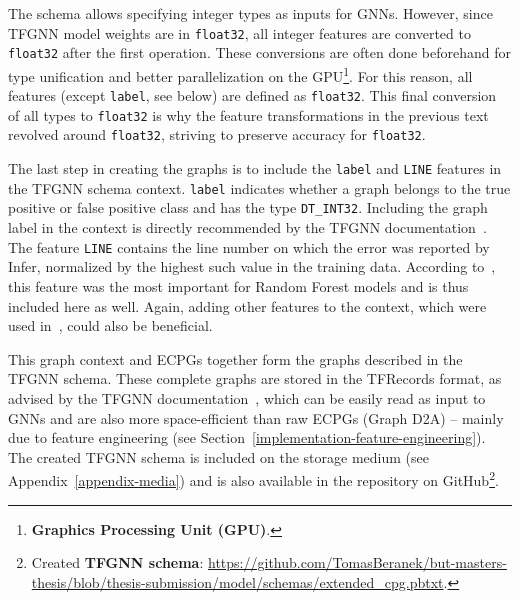 The schema allows specifying integer types as inputs for GNNs. However, since TFGNN model weights are in \texttt{float32}, all integer features are converted to \texttt{float32} after the first operation. These conversions are often done beforehand for type unification and better parallelization on the GPU\footnote{\textbf{Graphics Processing Unit (GPU)}.}. For this reason, all features (except \texttt{label}, see below) are defined as \texttt{float32}. This final conversion of all types to \texttt{float32} is why the feature transformations in the previous text revolved around \texttt{float32}, striving to preserve accuracy for \texttt{float32}.

The last step in creating the graphs is to include the \texttt{label} and \texttt{LINE} features in the TFGNN schema context. \texttt{label} indicates whether a graph belongs to the true positive or false positive class and has the type \texttt{DT\_INT32}. Including the graph label in the context is directly recommended by the TFGNN documentation~\cite{tfgnn-schema}. The feature \texttt{LINE} contains the line number on which the error was reported by Infer, normalized by the highest such value in the training data. According to~\cite{pujar2024analyzing}, this feature was the most important for Random Forest models and is thus included here as well. Again, adding other features to the context, which were used in~\cite{D2A-zheng2021d2a, pujar2024analyzing}, could also be beneficial.

This graph context and ECPGs together form the graphs described in the TFGNN schema. These complete graphs are stored in the TFRecords format, as advised by the TFGNN documentation~\cite{tfgnn-schema}, which can be easily read as input to GNNs and are also more space-efficient than raw ECPGs (Graph D2A) -- mainly due to feature engineering (see Section~\ref{implementation-feature-engineering}). The created TFGNN schema is included on the storage medium (see Appendix~\ref{appendix-media}) and is also available in the repository on GitHub\footnote{Created \textbf{TFGNN schema}: \url{https://github.com/TomasBeranek/but-masters-thesis/blob/thesis-submission/model/schemas/extended_cpg.pbtxt}.}.


